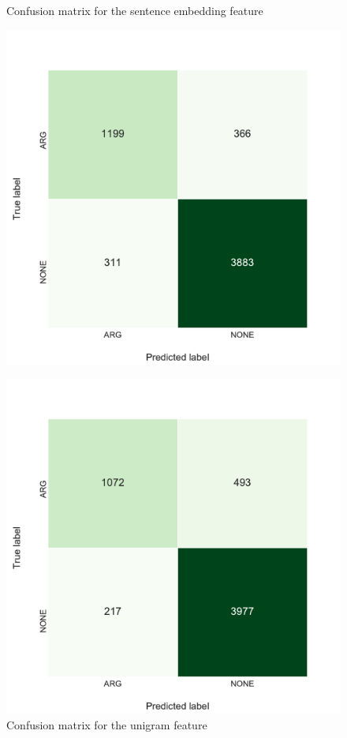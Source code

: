 \begin{figure}[h]
    \begin{minipage}{.5\linewidth}
   \caption{Confusion matrix for the sentence embedding feature} 
    \label{tbl:3_conf_inf}
 \centering
	\includegraphics[width=1\textwidth]{images/experiments/conf-InferSent_True}
  \end{minipage} \hfill
    \begin{minipage}{.5\linewidth}
  
     \caption{Confusion matrix for the unigram feature} 
       \label{tbl:3_conf_uni}
 \centering
	\includegraphics[width=1\textwidth]{images/experiments/conf-Unigrams_True}
    \end{minipage} 
\end{figure}


